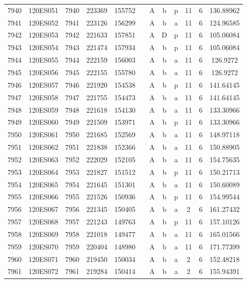 \begin{tabular}{|*{12}{c|}}
7940 & 120ES051 & 7940 & 223369 & 155752 &  & A & b & p & 11 & 6 & 136.88962 \\ 
7941 & 120ES052 & 7941 & 223126 & 156299 &  & A & b & a & 11 & 6 & 124.96585 \\ 
7942 & 120ES053 & 7942 & 221633 & 157851 &  & A & D & p & 11 & 6 & 105.06084 \\ 
7943 & 120ES054 & 7943 & 221474 & 157934 &  & A & b & p & 11 & 6 & 105.06084 \\ 
7944 & 120ES055 & 7944 & 222159 & 156003 &  & A & b & a & 11 & 6 & 126.9272 \\ 
7945 & 120ES056 & 7945 & 222155 & 155780 &  & A & b & a & 11 & 6 & 126.9272 \\ 
7946 & 120ES057 & 7946 & 221920 & 154538 &  & A & b & p & 11 & 6 & 141.64145 \\ 
7947 & 120ES058 & 7947 & 221755 & 154473 &  & A & b & a & 11 & 6 & 141.64145 \\ 
7948 & 120ES059 & 7948 & 221618 & 154130 &  & A & b & a & 11 & 6 & 133.30966 \\ 
7949 & 120ES060 & 7949 & 221509 & 153971 &  & A & b & p & 11 & 6 & 133.30966 \\ 
7950 & 120ES061 & 7950 & 221685 & 152569 &  & A & b & a & 11 & 6 & 148.97118 \\ 
7951 & 120ES062 & 7951 & 221838 & 152366 &  & A & b & a & 11 & 6 & 150.88905 \\ 
7952 & 120ES063 & 7952 & 222029 & 152105 &  & A & b & a & 11 & 6 & 154.75635 \\ 
7953 & 120ES064 & 7953 & 221827 & 151512 &  & A & b & p & 11 & 6 & 150.21713 \\ 
7954 & 120ES065 & 7954 & 221645 & 151301 &  & A & b & a & 11 & 6 & 150.60089 \\ 
7955 & 120ES066 & 7955 & 221526 & 150936 &  & A & b & p & 11 & 6 & 154.99544 \\ 
7956 & 120ES067 & 7956 & 221345 & 150405 &  & A & b & a & 2 & 6 & 161.27432 \\ 
7957 & 120ES068 & 7957 & 221243 & 149763 &  & A & b & p & 11 & 6 & 157.10126 \\ 
7958 & 120ES069 & 7958 & 221018 & 149477 &  & A & b & a & 11 & 6 & 165.01566 \\ 
7959 & 120ES070 & 7959 & 220404 & 148980 &  & A & b & a & 11 & 6 & 171.77399 \\ 
7960 & 120ES071 & 7960 & 219450 & 150034 &  & A & b & a & 2 & 6 & 152.48218 \\ 
7961 & 120ES072 & 7961 & 219284 & 150414 &  & A & b & a & 2 & 6 & 155.94391 \\ 

\end{tabular}

